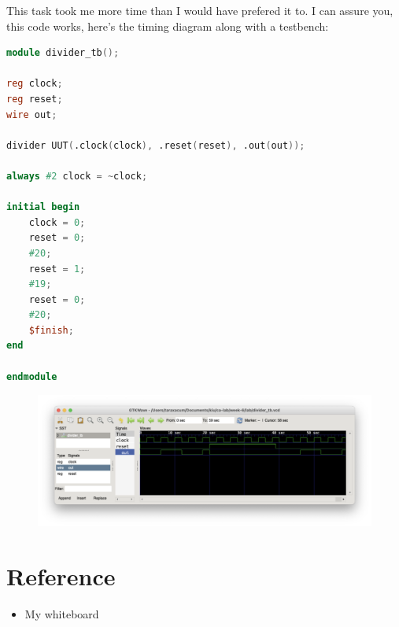 \documentclass{article}
\begin{document}
    This task took me more time than I would have prefered it to. I can assure you, this code works, here's the timing diagram along with a testbench:
    
    \begin{lstlisting}[language=verilog]
module divider_tb();

reg clock;
reg reset;
wire out;

divider UUT(.clock(clock), .reset(reset), .out(out));

always #2 clock = ~clock;

initial begin
    clock = 0;
    reset = 0;
    #20;
    reset = 1;
    #19;
    reset = 0;
    #20;
    $finish;
end

endmodule\end{lstlisting}

    \begin{figure}[h]
        \includegraphics[width=12cm]{timing-diagram.png}
    \end{figure}
    
    \section*{Reference}
    
    \begin{itemize}
        \item My whiteboard
    \end{itemize}
\end{document}
